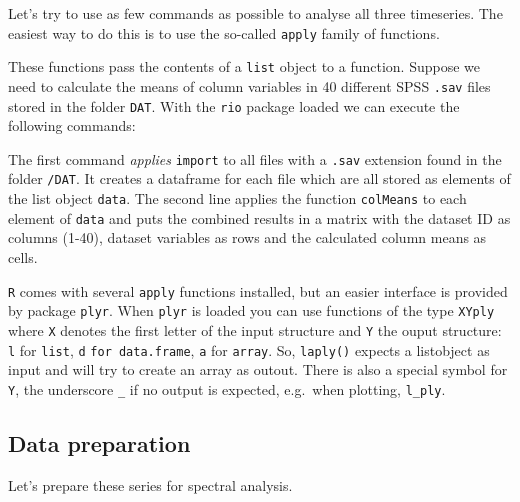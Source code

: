 \documentclass[]{book}
\newenvironment{Shaded}{\begin{snugshade}}{\end{snugshade}}
\newcommand{\KeywordTok}[1]{\textcolor[rgb]{0.13,0.29,0.53}{\textbf{{#1}}}}
\newcommand{\DataTypeTok}[1]{\textcolor[rgb]{0.13,0.29,0.53}{{#1}}}
\newcommand{\StringTok}[1]{\textcolor[rgb]{0.31,0.60,0.02}{{#1}}}
\newcommand{\NormalTok}[1]{{#1}}
\begin{document}
Let's try to use as few commands as possible to analyse all three
timeseries. The easiest way to do this is to use the so-called
\texttt{apply} family of functions.

These functions pass the contents of a \texttt{list} object to a
function. Suppose we need to calculate the means of column variables in
40 different SPSS \texttt{.sav} files stored in the folder \texttt{DAT}.
With the \texttt{rio} package loaded we can execute the following
commands:

\begin{Shaded}
\end{Shaded}

The first command \emph{applies} \texttt{import} to all files with a
\texttt{.sav} extension found in the folder \texttt{/DAT}. It creates a
dataframe for each file which are all stored as elements of the list
object \texttt{data}. The second line applies the function
\texttt{colMeans} to each element of \texttt{data} and puts the combined
results in a matrix with the dataset ID as columns (1-40), dataset
variables as rows and the calculated column means as cells.

\texttt{R} comes with several \texttt{apply} functions installed, but an
easier interface is provided by package \texttt{plyr}. When
\texttt{plyr} is loaded you can use functions of the type \texttt{XYply}
where \texttt{X} denotes the first letter of the input structure and
\texttt{Y} the ouput structure: \texttt{l} for \texttt{list}, \texttt{d}
\texttt{for\ \textquotesingle{}data.frame}, \texttt{a} for
\texttt{array}. So, \texttt{laply()} expects a listobject as input and
will try to create an array as outout. There is also a special symbol
for \texttt{Y}, the underscore \texttt{\_} if no output is expected,
e.g.~when plotting, \texttt{l\_ply}.

\subsection{Data preparation}\label{data-preparation}

Let's prepare these series for spectral analysis.
\end{document}
